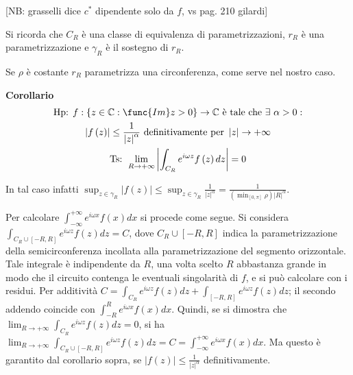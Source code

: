 \documentclass{article}
\begin{document}
[NB: grasselli dice $c^{\ast }$ dipendente solo da $f$, vs pag. 210 gilardi]

Si ricorda che $C_{R}$ \`{e} una classe di equivalenza di parametrizzazioni, 
$r_{R}$ \`{e} una parametrizzazione e $\gamma _{R}$ \`{e} il sostegno di $%
r_{R}$.

Se $\rho $ \`{e} costante $r_{R}$ parametrizza una circonferenza, come serve
nel nostro caso.

\textbf{Corollario}%
\begin{gather*}
\text{Hp: }f:\left\{ z\in 
\mathbb{C}
:\func{Im}z>0\right\} \rightarrow 
\mathbb{C}
\text{ \`{e} tale che }\exists \text{ }\alpha >0: \\
\left\vert f\left( z\right) \right\vert \leq \frac{1}{\left\vert
z\right\vert ^{\alpha }}\text{ definitivamente per }\left\vert z\right\vert
\rightarrow +\infty \\
\text{Ts: }\lim_{R\rightarrow +\infty }\left\vert \int_{C_{R}}e^{i\omega
z}f\left( z\right) dz\right\vert =0
\end{gather*}

In tal caso infatti $\sup_{z\in \gamma _{R}}\left\vert f\left( z\right)
\right\vert \leq \sup_{z\in \gamma _{R}}\frac{1}{\left\vert z\right\vert
^{\alpha }}=\frac{1}{\left( \min_{\left[ 0,\pi \right] }\rho \right)
\left\vert R\right\vert ^{\alpha }}$.

Per calcolare $\int_{-\infty }^{+\infty }e^{i\omega x}f\left( x\right) dx$
si procede come segue. Si considera $\int_{C_{R}\cup \left[ -R,R\right]
}e^{i\omega z}f\left( z\right) dz=C$, dove $C_{R}\cup \left[ -R,R\right] $
indica la parametrizzazione della semicirconferenza incollata alla
parametrizzazione del segmento orizzontale. Tale integrale \`{e}
indipendente da $R$, una volta scelto $R$ abbastanza grande in modo che il
circuito contenga le eventuali singolarit\`{a} di $f$, e si pu\`{o}
calcolare con i residui. Per additivit\`{a} $C=\int_{C_{R}}e^{i\omega
z}f\left( z\right) dz+\int_{\left[ -R,R\right] }e^{i\omega z}f\left(
z\right) dz$; il secondo addendo coincide con $\int_{-R}^{R}e^{i\omega
x}f\left( x\right) dx$. Quindi, se si dimostra che $\lim_{R\rightarrow
+\infty }\int_{C_{R}}e^{i\omega z}f\left( z\right) dz=0$, si ha $%
\lim_{R\rightarrow +\infty }\int_{C_{R}\cup \left[ -R,R\right] }e^{i\omega
z}f\left( z\right) dz=C=\int_{-\infty }^{+\infty }e^{i\omega x}f\left(
x\right) dx$. Ma questo \`{e} garantito dal corollario sopra, se $\left\vert
f\left( z\right) \right\vert \leq \frac{1}{\left\vert z\right\vert ^{\alpha }%
}$ definitivamente.
\end{document}
